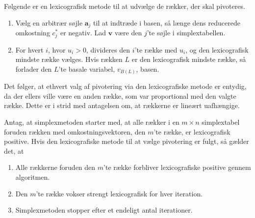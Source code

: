 %
Følgende er en lexicografisk metode til at udvælge de rækker, der skal pivoteres.
\begin{enumerate}
\item Vælg en arbitrær søjle $\textbf{a}_j$ til at indtræde i basen, så længe dens reducerede omkostning $c_j^*$ er negativ.
Lad $\textbf{v}$ være den $j$'te søjle i simplextabellen.
\item For hvert $i$, hvor $u_i>0$, divideres den $i$'te række med $u_i$, og den lexicografisk mindste række vælges. 
Hvis rækken $L$ er den lexicografisk mindste række, så forlader den $L$'te basale variabel, $v_{B(L)}$, basen.
\end{enumerate}
%
Det følger, at ethvert valg af pivotering via den lexicografiske metode er entydig, da der ellers ville være en anden række, som var proportional med den valgte række. 
Dette er i strid med antagelsen om, at rækkerne er lineært uafhængige.
%
\begin{thm}{}{}
Antag, at simplexmetoden starter med, at alle rækker i en $m \times n$ simplextabel foruden rækken med omkostningsvektoren, den $m$'te række, er lexicografisk positive.
Hvis den lexicografiske metode til at vælge pivotering er fulgt, så gælder det, at
%
\begin{enumerate}[label=(\alph*)]
\item Alle rækkerne foruden den $m$'te række forbliver lexicografiske positive gennem algoritmen.
\item Den $m$'te række vokser strengt lexicografisk for hver iteration.
\item Simplexmetoden stopper efter et endeligt antal iterationer. 
\end{enumerate}
\end{thm}
%
